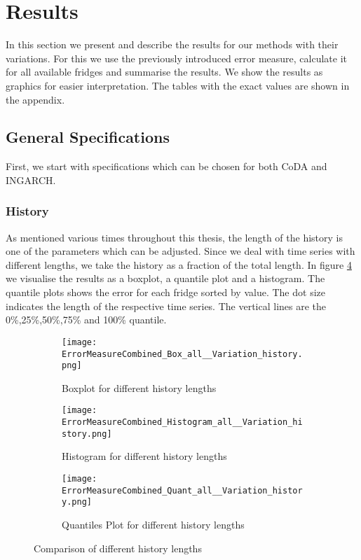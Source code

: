 \section{Results}
\label{sec:Results}

In this section we present and describe the results for our methods with their variations. For this we use the previously introduced error measure, calculate it for all available fridges and summarise the results. We show the results as graphics for easier interpretation. The tables with the exact values are shown in the appendix. 

\subsection{General Specifications}
\label{sec:General Specifications}

First, we start with specifications which can be chosen for both CoDA and INGARCH. 

\subsubsection{History}
\label{sec:History}

As mentioned various times throughout this thesis, the length of the history is one of the parameters which can be adjusted. Since we deal with time series with different lengths, we take the history as a fraction of the total length. In figure \ref{fig:History Comp1} we visualise the results as a boxplot, a quantile plot and a histogram. The quantile plots shows the error for each fridge sorted by value. The dot size indicates the length of the respective time series. The vertical lines are the 0\%,25\%,50\%,75\% and 100\% quantile. 

\begin{figure}[htb!]
\centering
\begin{subfigure}[b]{0.45\textwidth}
\texttt{[image: ErrorMeasureCombined\_Box\_all\_\_Variation\_history.png]}
\caption{Boxplot for different history lengths}
\label{fig:History Box}
\end{subfigure}
\hfill
\begin{subfigure}[b]{0.45\textwidth}
\texttt{[image: ErrorMeasureCombined\_Histogram\_all\_\_Variation\_history.png]}
\caption{Histogram for different history lengths}
\label{fig:History Hist}
\end{subfigure}
\hfill
\begin{subfigure}[b]{0.8\textwidth}
\texttt{[image: ErrorMeasureCombined\_Quant\_all\_\_Variation\_history.png]}
\caption{Quantiles Plot for different history lengths}
\label{fig:History Quant}
\end{subfigure}
\caption{Comparison of different history lengths}
\label{fig:History Comp1}
\end{figure}


